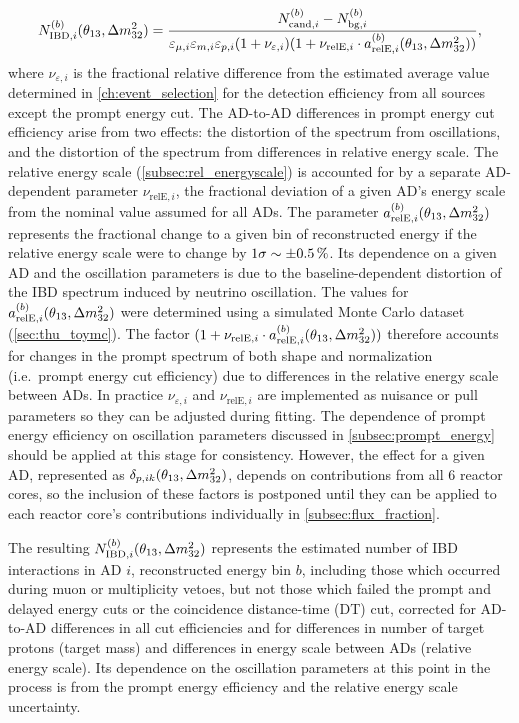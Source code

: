 \begin{equation}\label{eq:near_hall_bg_eff}
    N_{\text{IBD},i}^{(b)}(\theta_{13}, \Delta m^2_{32}) =
    \frac{N_{\text{cand},i}^{(b)} - N_{\text{bg},i}^{(b)}}{
        \varepsilon_{\mu,i}\varepsilon_{m,i}\varepsilon_{p,i}(1+\nu_{\varepsilon,i})
        (1 + \nu_{\text{relE},i}\cdot a_{\text{relE},i}^{(b)}(\theta_{13}, \Delta m^2_{32}))
    },
\end{equation}
where $\nu_{\varepsilon,i}$ is the fractional relative difference from
the estimated average value determined in \cref{ch:event_selection}
for the detection efficiency from all sources except the prompt energy cut.
The AD-to-AD differences in prompt energy cut efficiency arise from two effects:
the distortion of the spectrum from oscillations,
and the distortion of the spectrum from differences
in relative energy scale.
The relative energy scale (\cref{subsec:rel_energyscale})
is accounted for by a separate AD-dependent parameter $\nu_{\text{relE},i}$,
the fractional deviation of a given AD's energy scale
from the nominal value assumed for all ADs.
The parameter $a_{\text{relE},i}^{(b)}(\theta_{13}, \Delta m^2_{32})$
represents the fractional change to a given bin of reconstructed energy
if the relative energy scale were to change by $1\sigma \sim \SI{+-0.5}{\percent}$.
Its dependence on a given AD and the oscillation parameters is
due to the baseline-dependent distortion of the IBD spectrum
induced by neutrino oscillation.
The values for $a_{\text{relE},i}^{(b)}(\theta_{13}, \Delta m^2_{32})$ were determined using
a simulated Monte Carlo dataset (\cref{sec:thu_toymc}).
The factor $(1 + \nu_{\text{relE},i}\cdot a_{\text{relE},i}^{(b)}(\theta_{13},\Delta m^2_{32}))$
therefore accounts for changes in the prompt spectrum of
both shape and normalization (i.e.\ prompt energy cut efficiency)
due to differences in the relative energy scale between ADs.
In practice $\nu_{\varepsilon,i}$ and $\nu_{\text{relE},i}$
are implemented as nuisance or pull parameters
so they can be adjusted during fitting.
The dependence of prompt energy efficiency on oscillation parameters
discussed in \cref{subsec:prompt_energy}
should be applied at this stage for consistency.
However, the effect for a given AD, represented as $\delta_{p,ik}(\theta_{13}, \Delta m^2_{32})$,
depends on contributions from all 6 reactor cores,
so the inclusion of these factors is postponed
until they can be applied to each reactor core's contributions
individually in \cref{subsec:flux_fraction}.

The resulting $N_{\text{IBD},i}^{(b)}(\theta_{13}, \Delta m^2_{32})$ represents
the estimated number of IBD interactions in AD $i$,
reconstructed energy bin $b$,
including those which occurred during muon or multiplicity vetoes,
but not those which failed the prompt and delayed energy cuts
or the coincidence distance-time (DT) cut,
corrected for AD-to-AD differences in all cut efficiencies
and for differences in number of target protons (target mass)
and differences in energy scale between ADs (relative energy scale).
Its dependence on the oscillation parameters at this point in the process
is from the prompt energy efficiency
and the relative energy scale uncertainty.


